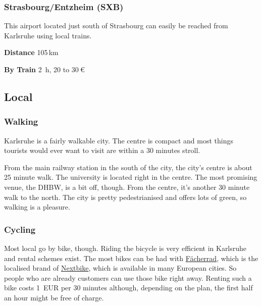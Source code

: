\begin{multicols}{2}
\subsubsection{Strasbourg/Entzheim (SXB)}

This airport located just south of Strasbourg can easily be reached from Karlsruhe
using local trains.

\begin{labeling}{\hspace*{10ex}}
  \item[\bf Distance] 105\,km
  \item[\bf By Train] \SI{2}{\hour}, 20 to $\SI{30}{\euro}$
\end{labeling}

\end{multicols}



\subsection{Local}

\subsubsection{Walking}
Karlsruhe is a fairly walkable city.
The centre is compact and most things tourists would ever want to visit
are within a 30 minutes stroll.

From the main railway station in the south of the city,
the city's centre is about 25 minute walk.
The university is located right in the centre.
The most promising venue, the DHBW, is a bit off, though.
From the centre, it's another 30 minute walk to the north.
The city is pretty pedestrianised and offers lots of green,
so walking is a pleasure.

\subsubsection{Cycling}
Most local go by bike, though.
Riding the bicycle is very efficient in Karlsruhe and
rental schemes exist.
The most bikes can be had with \href{http://www.faecherrad.de/de/karlsruhe/preise/}{Fächerrad},
which is the localised brand of \href{http://www.nextbike.de/de/news/das-karlsruher-leihfahrrad-hei%C3%9Ft-f%C3%A4cherrad/}{Nextbike},
which is available in many European cities.
So people who are already customers can use those bike right away.
Renting such a bike costs 1~EUR per 30 minutes although,
depending on the plan, the first half an hour might be free of charge.

